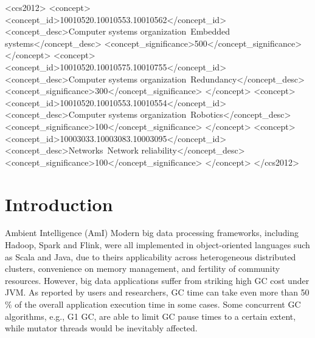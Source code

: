 \documentclass[sigplan, screen]{acmart}
\begin{document}
\begin{CCSXML}
<ccs2012>
 <concept>
  <concept_id>10010520.10010553.10010562</concept_id>
  <concept_desc>Computer systems organization~Embedded systems</concept_desc>
  <concept_significance>500</concept_significance>
 </concept>
 <concept>
  <concept_id>10010520.10010575.10010755</concept_id>
  <concept_desc>Computer systems organization~Redundancy</concept_desc>
  <concept_significance>300</concept_significance>
 </concept>
 <concept>
  <concept_id>10010520.10010553.10010554</concept_id>
  <concept_desc>Computer systems organization~Robotics</concept_desc>
  <concept_significance>100</concept_significance>
 </concept>
 <concept>
  <concept_id>10003033.10003083.10003095</concept_id>
  <concept_desc>Networks~Network reliability</concept_desc>
  <concept_significance>100</concept_significance>
 </concept>
</ccs2012>
\end{CCSXML}



\maketitle
\section{Introduction}
Ambient Intelligence (AmI) 
Modern big data processing frameworks, including Hadoop\cite{shvachko2010hadoop}, Spark\cite{zaharia2010spark} and
Flink\cite{carbone2015apache}, were all implemented in object-oriented languages such as Scala and Java, due to 
theirs applicability across heterogeneous distributed clusters, convenience on memory management, and fertility 
of community resources. However, big data applications suffer from striking high GC cost under JVM. As reported by users and researchers,
GC time can take even more than 50$\%$ of the overall application execution time in some cases\cite{stackoverflow, bu2013bloat}.
Some concurrent GC algorithms, e.g., G1 GC\cite{detlefs2004garbage}, are able to limit GC pause times to a certain extent, 
while mutator threads would be inevitably affected\cite{xu2019experimental, wu2020platinum}.
\end{document}
